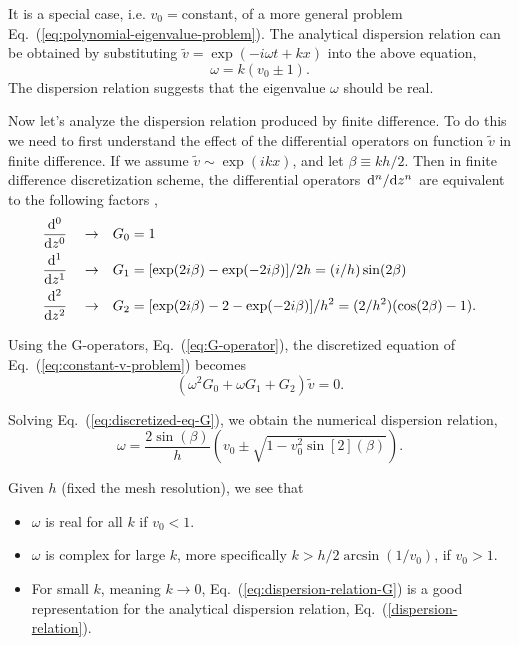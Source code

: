 It is a special case, i.e. $v_0=$constant, of a more general problem Eq.~(\ref{eq:polynomial-eigenvalue-problem}). The analytical dispersion relation can be obtained by substituting $\tilde{v} = \exp(-i\omega t + kx)$ into the above equation,
\begin{equation} \label{dispersion-relation}
	\omega = k(v_0 \pm 1).
\end{equation}
The dispersion relation suggests that the eigenvalue $\omega$ should be real.

Now let's analyze the dispersion relation produced by finite difference. To do this we need to first understand the effect of the differential operators on function $\tilde{v}$ in finite difference. If we assume $\tilde{v}\sim \exp(ikx)$, and let $\beta\equiv kh/2$. Then in finite difference discretization scheme, the differential operators $\dv*[n]{z}$ are equivalent to the following factors \cite{llobet_spectral_1990},
\begin{equation}
	\begin{aligned}
		\dv[0]{z} \quad \to \quad & G_0 = 1                                                               \\
		\dv[1]{z} \quad \to \quad & G_1 = [\exp(2i\beta)-\exp(-2i\beta)]/2h = (i/h)\sin(2\beta)           \\
		\dv[2]{z} \quad \to \quad & G_2 = [\exp(2i\beta)-2-\exp(-2i\beta)]/h^2 = (2/h^2)(\cos(2\beta)-1).
	\end{aligned}
	\label{eq:G-operator}
\end{equation}

Using the G-operators, Eq.~(\ref{eq:G-operator}), the discretized equation of Eq.~(\ref{eq:constant-v-problem}) becomes
\begin{equation} \label{eq:discretized-eq-G}
	(\omega^2G_0 + \omega G_1 + G_2)\tilde{v} = 0.
\end{equation}

Solving Eq.~(\ref{eq:discretized-eq-G}), we obtain the numerical dispersion relation,
\begin{equation}
	\omega = \frac{2\sin(\beta)}{h}\left(v_0 \pm \sqrt{1 - v_0^2\sin[2](\beta)}\right).
	\label{eq:dispersion-relation-G}
\end{equation}

Given $h$ (fixed the mesh resolution), we see that
\begin{itemize}
	\item $\omega$ is real for all $k$ if $v_0 < 1$.
	\item $\omega$ is complex for large $k$, more specifically $k>h/2\arcsin(1/v_0)$, if $v_0 > 1$.
	\item For small $k$, meaning $k\to 0$, Eq.~(\ref{eq:dispersion-relation-G}) is a good representation for the analytical dispersion relation, Eq.~(\ref{dispersion-relation}).
\end{itemize}

